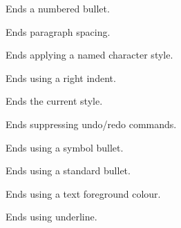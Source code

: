 Ends a numbered bullet.

\label{wxrichtextbufferendparagraphspacing}


Ends paragraph spacing.

\label{wxrichtextbufferendparagraphstyle}


Ends applying a named character style.

\label{wxrichtextbufferendrightindent}


Ends using a right indent.

\label{wxrichtextbufferendstyle}


Ends the current style.

\label{wxrichtextbufferendsuppressundo}


Ends suppressing undo/redo commands.

\label{wxrichtextbufferendsymbolbullet}


Ends using a symbol bullet.

\label{wxrichtextbufferendstandardbullet}


Ends using a standard bullet.

\label{wxrichtextbufferendtextcolour}


Ends using a text foreground colour.

\label{wxrichtextbufferendunderline}


Ends using underline.

\label{wxrichtextbufferendurl}

